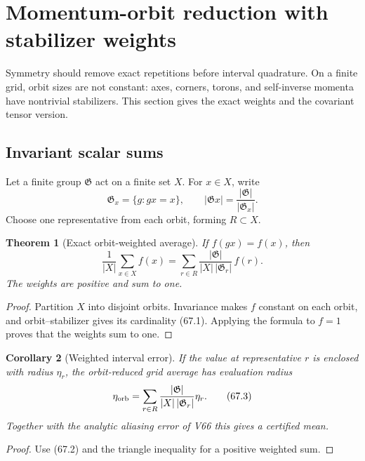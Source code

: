 \documentclass[11pt]{article}
\newtheorem{theorem}{Theorem}[section]
\newtheorem{corollary}[theorem]{Corollary}
\begin{document}
\section{Momentum-orbit reduction with stabilizer weights}
\label{sec:v11v67}

Symmetry should remove exact repetitions before interval quadrature.
On a finite grid, orbit sizes are not constant: axes, corners, torons,
and self-inverse momenta have nontrivial stabilizers.  This section
gives the exact weights and the covariant tensor version.

\subsection{Invariant scalar sums}

Let a finite group \({\mathfrak G}\) act on a finite set \(X\).
For \(x\in X\), write
\[
 {\mathfrak G}_x=\{g:g x=x\},\qquad
 |{\mathfrak G}x|=\frac{|{\mathfrak G}|}{|{\mathfrak G}_x|}. \tag{67.1}
\]
Choose one representative from each orbit, forming \(R\subset X\).

\begin{theorem}[Exact orbit-weighted average]
\label{thm:v11v67-orbit}
If \(f(gx)=f(x)\), then
\[
 \boxed{
 \frac1{|X|}\sum_{x\in X}f(x)
 =\sum_{r\in R}
    \frac{|{\mathfrak G}|}
         {|X|\,|{\mathfrak G}_r|}\,f(r).}                    \tag{67.2}
\]
The weights are positive and sum to one.
\end{theorem}

\begin{proof}
Partition \(X\) into disjoint orbits.  Invariance makes \(f\) constant
on each orbit, and orbit--stabilizer gives its cardinality (67.1).
Applying the formula to \(f=1\) proves that the weights sum to one.
\end{proof}

\begin{corollary}[Weighted interval error]
\label{cor:v11v67-interval}
If the value at representative \(r\) is enclosed with radius
\(\eta_r\), the orbit-reduced grid average has evaluation radius
\[
                  \eta_{\rm orb}
     =\sum_{r\in R}
       \frac{|{\mathfrak G}|}
            {|X|\,|{\mathfrak G}_r|}\eta_r.                  \tag{67.3}
\]
Together with the analytic aliasing error of V66 this gives a certified
mean.
\end{corollary}

\begin{proof}
Use (67.2) and the triangle inequality for a positive weighted sum.
\end{proof}
\end{document}
